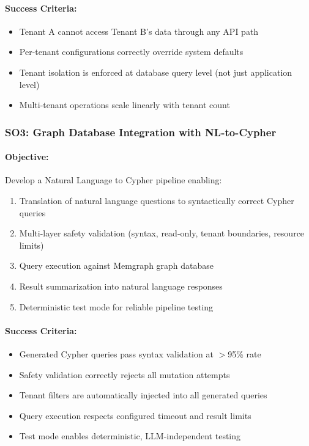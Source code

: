 \paragraph{Success Criteria:}
\begin{itemize}
    \item Tenant A cannot access Tenant B's data through any API path
    \item Per-tenant configurations correctly override system defaults
    \item Tenant isolation is enforced at database query level (not just application level)
    \item Multi-tenant operations scale linearly with tenant count
\end{itemize}

\subsubsection{SO3: Graph Database Integration with NL-to-Cypher}

\paragraph{Objective:} Develop a Natural Language to Cypher pipeline enabling:

\begin{enumerate}[label=\alph*)]
    \item Translation of natural language questions to syntactically correct Cypher queries
    \item Multi-layer safety validation (syntax, read-only, tenant boundaries, resource limits)
    \item Query execution against Memgraph graph database
    \item Result summarization into natural language responses
    \item Deterministic test mode for reliable pipeline testing
\end{enumerate}

\paragraph{Success Criteria:}
\begin{itemize}
    \item Generated Cypher queries pass syntax validation at $>$95\% rate
    \item Safety validation correctly rejects all mutation attempts
    \item Tenant filters are automatically injected into all generated queries
    \item Query execution respects configured timeout and result limits
    \item Test mode enables deterministic, LLM-independent testing
\end{itemize}

